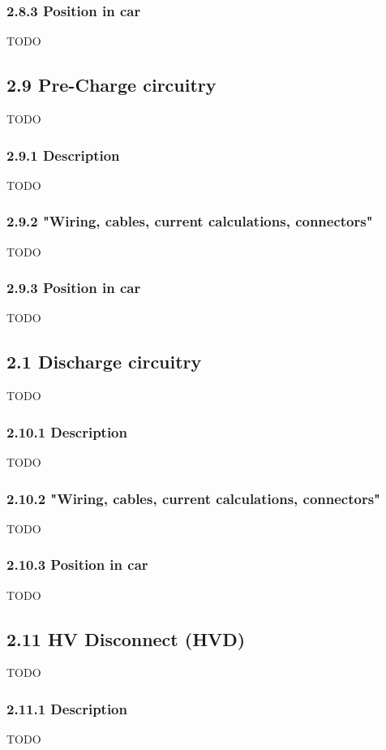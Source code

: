 \documentclass{article}
\begin{document}
\subsubsection*{2.8.3 Position in car}
TODO

\subsection*{2.9 Pre-Charge circuitry}
TODO

\subsubsection*{2.9.1 Description}
TODO

\subsubsection*{2.9.2 "Wiring, cables, current calculations, connectors"}
TODO

\subsubsection*{2.9.3 Position in car}
TODO

\subsection*{2.1 Discharge circuitry}
TODO

\subsubsection*{2.10.1 Description}
TODO

\subsubsection*{2.10.2 "Wiring, cables, current calculations, connectors"}
TODO

\subsubsection*{2.10.3 Position in car}
TODO

\subsection*{2.11 HV Disconnect (HVD)}
TODO

\subsubsection*{2.11.1 Description}
TODO
\end{document}
